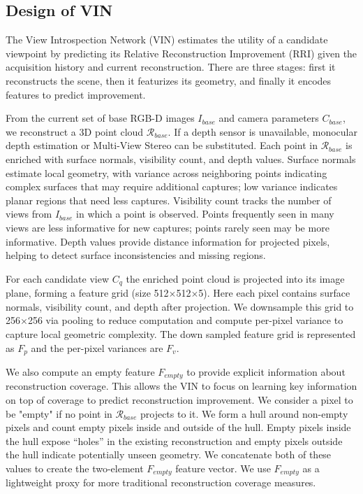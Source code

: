 \subsection{Design of VIN}\label{ssec:vin_design}
\vspace{-0.25em}

The View Introspection Network (VIN) estimates the utility of a candidate viewpoint by predicting its Relative Reconstruction Improvement (RRI) given the acquisition history and current reconstruction. There are three stages: first it reconstructs the scene, then it featurizes its geometry, and finally it encodes features to predict improvement.

From the current set of base RGB-D images $I_{base}$ and camera parameters $C_{base}$, we reconstruct a 3D point cloud $\mathcal{R}_{base}$. If a depth sensor is unavailable, monocular depth estimation or Multi-View Stereo can be substituted. Each point in $\mathcal{R}_{base}$ is enriched with surface normals, visibility count, and depth values. Surface normals estimate local geometry, with variance across neighboring points indicating complex surfaces that may require additional captures; low variance indicates planar regions that need less captures. Visibility count tracks the number of views from $I_{base}$ in which a point is observed. Points frequently seen in many views are less informative for new captures; points rarely seen may be more informative. Depth values provide distance information for projected pixels, helping to detect surface inconsistencies and missing regions.

For each candidate view $C_q$ the enriched point cloud is projected into its image plane, forming a feature grid (size 512$\times$512$\times$5). Here each pixel contains surface normals, visibility count, and depth after projection. We downsample this grid to 256$\times$256 via pooling to reduce computation and compute per-pixel variance to capture local geometric complexity. The down sampled feature grid is represented as $F_p$ and the per-pixel variances are $F_v$.

We also compute an empty feature $F_{empty}$ to provide explicit information about reconstruction coverage. This allows the VIN to focus on learning key information on top of coverage to predict reconstruction improvement. We consider a pixel to be "empty" if no point in $\mathcal{R}_{base}$ projects to it. We form a hull around non-empty pixels and count empty pixels inside and outside of the hull. Empty pixels inside the hull expose “holes” in the existing reconstruction and empty pixels outside the hull indicate potentially unseen geometry. We concatenate both of these values to create the two-element $F_{empty}$ feature vector. We use $F_{empty}$ as a lightweight proxy for more traditional reconstruction coverage measures.

